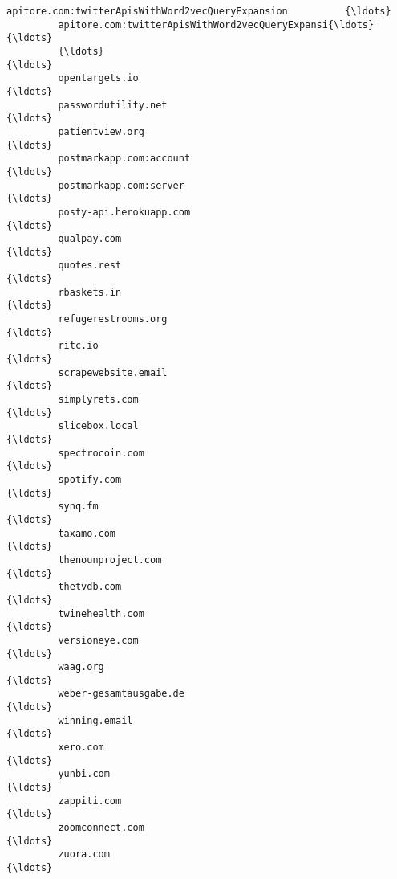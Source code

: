 \documentclass[11pt]{article}
\begin{document}
\begin{Verbatim}[commandchars=\\\{\}]
         apitore.com:twitterApisWithWord2vecQueryExpansion          {\ldots}           
         apitore.com:twitterApisWithWord2vecQueryExpansi{\ldots}         {\ldots}           
         {\ldots}                                                        {\ldots}           
         opentargets.io                                             {\ldots}           
         passwordutility.net                                        {\ldots}           
         patientview.org                                            {\ldots}           
         postmarkapp.com:account                                    {\ldots}           
         postmarkapp.com:server                                     {\ldots}           
         posty-api.herokuapp.com                                    {\ldots}           
         qualpay.com                                                {\ldots}           
         quotes.rest                                                {\ldots}           
         rbaskets.in                                                {\ldots}           
         refugerestrooms.org                                        {\ldots}           
         ritc.io                                                    {\ldots}           
         scrapewebsite.email                                        {\ldots}           
         simplyrets.com                                             {\ldots}           
         slicebox.local                                             {\ldots}           
         spectrocoin.com                                            {\ldots}           
         spotify.com                                                {\ldots}           
         synq.fm                                                    {\ldots}           
         taxamo.com                                                 {\ldots}           
         thenounproject.com                                         {\ldots}           
         thetvdb.com                                                {\ldots}           
         twinehealth.com                                            {\ldots}           
         versioneye.com                                             {\ldots}           
         waag.org                                                   {\ldots}           
         weber-gesamtausgabe.de                                     {\ldots}           
         winning.email                                              {\ldots}           
         xero.com                                                   {\ldots}           
         yunbi.com                                                  {\ldots}           
         zappiti.com                                                {\ldots}           
         zoomconnect.com                                            {\ldots}           
         zuora.com                                                  {\ldots}           
         

\end{Verbatim}
\end{document}
